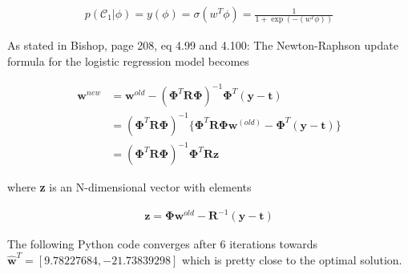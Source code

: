\documentclass[a4paper]{article}
\begin{document}
\begin{align*}
p(\mathcal{C}_1 | \phi ) = y(\phi) = \sigma(w^T \phi) = \frac{1}{1 + \exp(-(w^T\phi))}
\end{align*}

As stated in Bishop, page 208, eq 4.99 and 4.100: The Newton-Raphson update formula for the logistic regression model becomes 

\begin{align*}
\textbf{w}^{new} &= \textbf{w}^{old} - (\boldsymbol{\Phi} ^T \textbf{R} \boldsymbol{\Phi} )^{-1} \boldsymbol{\Phi} ^T (\textbf{y} - \textbf{t})\\
&= (\boldsymbol{\Phi}^T \textbf{R} \boldsymbol{\Phi} )^{-1} \{ \boldsymbol{\Phi}^T \textbf{R}  \boldsymbol{\Phi} \textbf{w}^{(old)} - \boldsymbol{\Phi}^T (\textbf{y} - \textbf{t})  \}\\
&= (\boldsymbol{\Phi}^T \textbf{R} \boldsymbol{\Phi} )^{-1} \boldsymbol{\Phi}^T \textbf{R} \textbf{z} 
\end{align*}

where \textbf{z} is an N-dimensional vector with elements

\begin{align*}
\textbf{z} = \boldsymbol{\Phi} \textbf{w}^{old} - \textbf{R}^{-1} (\textbf{y} -\textbf{t})
\end{align*}



The following Python code converges after 6 iterations towards $\hat{\textbf{w}}^T = [  9.78227684, -21.73839298]$ which is pretty close to the optimal solution.
\end{document}
